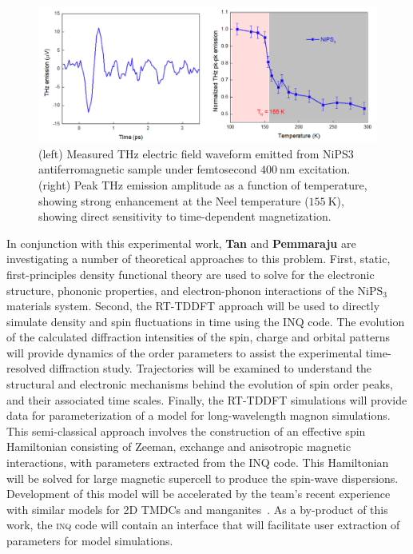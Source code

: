 \begin{figure}[ht]
    \centering\includegraphics[width=1.0\linewidth]{figures/NiPS3}
    \caption{
        (left)  Measured THz electric field waveform emitted from NiPS3 antiferromagnetic sample under femtosecond \(400~\mathrm{nm}\) excitation.
        (right) Peak THz emission amplitude as a function of temperature, showing strong enhancement at the Neel temperature (\(155~\mathrm{K}\)), showing direct sensitivity to time-dependent magnetization.
    }
    \label{fig:NiPS3}
\end{figure}

In conjunction with this experimental work, {\bf Tan} and {\bf Pemmaraju} are investigating a number of theoretical approaches to this problem.
First, static, first-principles density functional theory are used to solve for the electronic structure, phononic properties, and electron-phonon interactions of the \(\mathrm{NiPS_3}\) materials system. 
Second, the RT-TDDFT approach will be used to directly simulate density and spin fluctuations in time using the INQ code.
The evolution of the calculated diffraction intensities of the spin, charge and orbital patterns will provide dynamics of the order parameters to assist the experimental time-resolved diffraction study.
Trajectories will be examined to understand the structural and electronic mechanisms behind the evolution of spin order peaks, and their associated time scales. 
Finally, the RT-TDDFT simulations will provide data for parameterization of a model for long-wavelength magnon simulations. 
This semi-classical approach involves the construction of an effective spin Hamiltonian consisting of Zeeman, exchange and anisotropic magnetic interactions, with parameters extracted from the INQ code. 
This Hamiltonian will be solved for large magnetic supercell to produce the spin-wave dispersions. 
Development of this model will be accelerated by the team’s recent experience with similar models for 2D TMDCs and manganites~\cite{Siddiqui2020, Rajpurohit2020}. 
As a by-product of this work, the \textsc{inq} code will contain an interface that will facilitate user extraction of parameters for model simulations.

